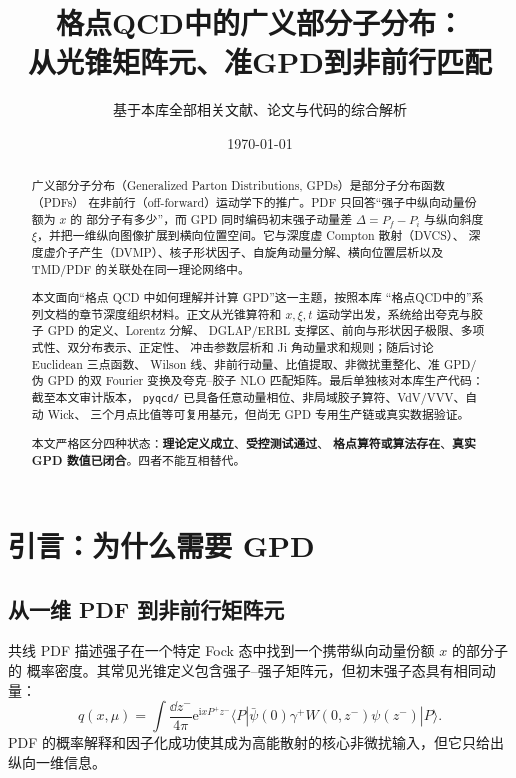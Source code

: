 \documentclass[12pt,a4paper]{ctexart}
\title{\heiti 格点QCD中的广义部分子分布：\\
从光锥矩阵元、准GPD到非前行匹配}
\author{基于本库全部相关文献、论文与代码的综合解析}
\date{\today}
\theoremstyle{definition}
\newcommand{\ii}{\mathrm{i}}
\newcommand{\ee}{\mathrm{e}}
\begin{document}
\maketitle

\begin{abstract}
\noindent
广义部分子分布（Generalized Parton Distributions, GPDs）是部分子分布函数（PDFs）
在非前行（off-forward）运动学下的推广。PDF 只回答“强子中纵向动量份额为 $x$ 的
部分子有多少”，而 GPD 同时编码初末强子动量差 $\Delta=P_f-P_i$ 与纵向斜度
$\xi$，并把一维纵向图像扩展到横向位置空间。它与深度虚 Compton 散射（DVCS）、
深度虚介子产生（DVMP）、核子形状因子、自旋角动量分解、横向位置层析以及 TMD/PDF
的关联处在同一理论网络中。

本文面向“格点 QCD 中如何理解并计算 GPD”这一主题，按照本库
“格点QCD中的”系列文档的章节深度组织材料。正文从光锥算符和
$x,\xi,t$ 运动学出发，系统给出夸克与胶子 GPD 的定义、Lorentz 分解、
DGLAP/ERBL 支撑区、前向与形状因子极限、多项式性、双分布表示、正定性、
冲击参数层析和 Ji 角动量求和规则；随后讨论 Euclidean 三点函数、
Wilson 线、非前行动量、比值提取、非微扰重整化、准 GPD/伪 GPD 的双 Fourier
变换及夸克--胶子 NLO 匹配矩阵。最后单独核对本库生产代码：截至本文审计版本，
\texttt{pyqcd/} 已具备任意动量相位、非局域胶子算符、VdV/VVV、自动 Wick、
三个月点比值等可复用基元，但尚无 GPD 专用生产链或真实数据验证。

本文严格区分四种状态：\textbf{理论定义成立}、\textbf{受控测试通过}、
\textbf{格点算符或算法存在}、\textbf{真实 GPD 数值已闭合}。四者不能互相替代。
\end{abstract}

\tableofcontents
\newpage

\section{引言：为什么需要 GPD}

\subsection{从一维 PDF 到非前行矩阵元}

共线 PDF 描述强子在一个特定 Fock 态中找到一个携带纵向动量份额 $x$ 的部分子的
概率密度。其常见光锥定义包含强子--强子矩阵元，但初末强子态具有相同动量：
\begin{equation}
q(x,\mu)
=\int\frac{\dd z^-}{4\pi}\ee^{\ii xP^+z^-}
\langle P|\bar\psi(0)\gamma^+
W(0,z^-)\psi(z^-)|P\rangle .
\label{eq:pdf-lightcone}
\end{equation}
PDF 的概率解释和因子化成功使其成为高能散射的核心非微扰输入，但它只给出
纵向一维信息。
\end{document}

